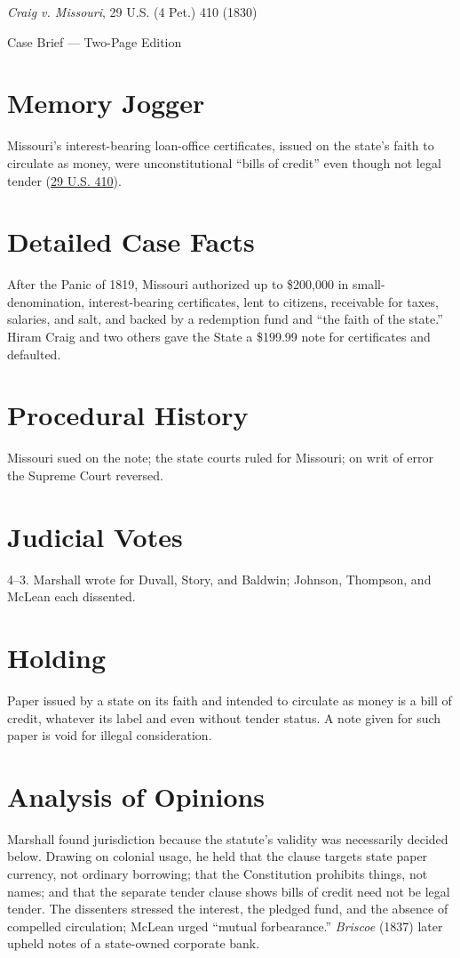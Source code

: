 \documentclass[12pt]{article}
\begin{document}
\begin{center}
{\LARGE \textit{Craig v. Missouri}, 29 U.S. (4 Pet.) 410 (1830)\par}
\vspace{0.5em}
{\large Case Brief --- Two-Page Edition\par}
\end{center}

\section{Memory Jogger}
Missouri's interest-bearing loan-office certificates, issued on the state's faith to circulate as money, were unconstitutional ``bills of credit'' even though not legal tender (\href{https://supreme.justia.com/cases/federal/us/29/410/}{29 U.S. 410}).

\section{Detailed Case Facts}
After the Panic of 1819, Missouri authorized up to \$200,000 in small-denomination, interest-bearing certificates, lent to citizens, receivable for taxes, salaries, and salt, and backed by a redemption fund and ``the faith of the state.'' Hiram Craig and two others gave the State a \$199.99 note for certificates and defaulted.

\section{Procedural History}
Missouri sued on the note; the state courts ruled for Missouri; on writ of error the Supreme Court reversed.

\section{Judicial Votes}
4--3. Marshall wrote for Duvall, Story, and Baldwin; Johnson, Thompson, and McLean each dissented.

\section{Holding}
Paper issued by a state on its faith and intended to circulate as money is a bill of credit, whatever its label and even without tender status. A note given for such paper is void for illegal consideration.

\section{Analysis of Opinions}
Marshall found jurisdiction because the statute's validity was necessarily decided below. Drawing on colonial usage, he held that the clause targets state paper currency, not ordinary borrowing; that the Constitution prohibits things, not names; and that the separate tender clause shows bills of credit need not be legal tender. The dissenters stressed the interest, the pledged fund, and the absence of compelled circulation; McLean urged ``mutual forbearance.'' \textit{Briscoe} (1837) later upheld notes of a state-owned corporate bank.
\end{document}
